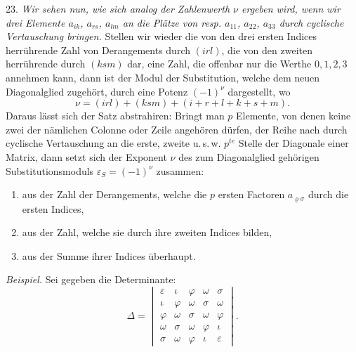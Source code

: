 \documentclass[11pt]{article}
\let\Delta\varDelta
\begin{document}
23. \textit{Wir sehen nun, wie sich analog der Zahlenwerth $\nu$ ergeben wird,
wenn wir drei Elemente $a_{ik}$, $a_{rs}$, $a_{lm}$ an die Pl\"atze von resp.
$a_{11}$, $a_{22}$, $a_{33}$ durch cyclische Vertauschung bringen.} Stellen wir
wieder die von den drei ersten Indices herr\"uhrende Zahl von Derangements durch
$(irl)$, die von den zweiten herr\"uhrende durch $(ksm)$ dar, eine Zahl, die
offenbar nur die Werthe $0, 1, 2, 3$ annehmen kann, dann ist der Modul der
Substitution, welche dem neuen Diagonalglied zugeh\"ort, durch eine Potenz
$(-1)^{\nu}$ dargestellt, wo
\[
\nu = (irl) + (ksm) + (i + r + l + k + s + m).
\]
Daraus l\"asst sich der Satz abstrahiren: \glqq Bringt man $p$ Elemente, von
denen keine zwei der n\"amlichen Colonne oder Zeile angeh\"oren d\"urfen, der
Reihe nach durch cyclische Vertauschung an die erste, zweite u.\,s.\,w.
$p^{te}$ Stelle der Diagonale einer Matrix, dann setzt sich der Exponent $\nu$
des zum Diagonalglied geh\"origen Substitutionsmoduls $\varepsilon_S = (-1)^{\nu}$
zusammen:
\begin{enumerate}
\item[1)] aus der Zahl der Derangements, welche die $p$ ersten Factoren
$a_{\varrho\sigma}$ durch die ersten Indices,
\item[2)] aus der Zahl, welche sie durch ihre zweiten Indices bilden,
\item[3)] aus der Summe ihrer Indices \"uberhaupt.\grqq{}
\end{enumerate}
\textit{Beispiel.} Sei gegeben die Determinante:
\[
\Delta = \begin{vmatrix}
\varepsilon & \iota & \varphi & \omega & \sigma \\
\iota & \varphi & \omega & \sigma & \omega \\
\varphi & \omega & \sigma & \omega & \varphi \\
\omega & \sigma & \omega & \varphi & \iota \\
\sigma & \omega & \varphi & \iota & \varepsilon
\end{vmatrix}.
\]
\end{document}
